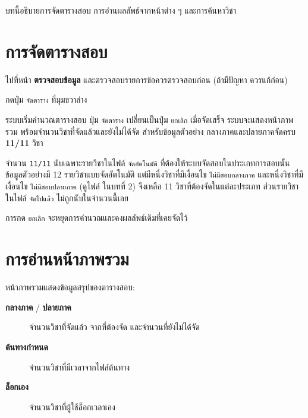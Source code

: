 
\noindent บทนี้อธิบายการจัดตารางสอบ การอ่านผลลัพธ์จากหน้าต่าง ๆ และการค้นหาวิชา

\section{การจัดตารางสอบ}

\begin{steps}
  \item ไปที่หน้า \textbf{ตรวจสอบข้อมูล} และตรวจสอบรายการข้อควรตรวจสอบก่อน
        (ถ้ามีปัญหา ควรแก้ก่อน)
  \item กดปุ่ม \texttt{จัดตาราง} ที่มุมขวาล่าง
\end{steps}

\begin{expected}
ระบบเริ่มคำนวณตารางสอบ ปุ่ม \texttt{จัดตาราง} เปลี่ยนเป็นปุ่ม \texttt{ยกเลิก}
เมื่อจัดเสร็จ ระบบจะแสดงหน้าภาพรวม พร้อมจำนวนวิชาที่จัดแล้วและยังไม่ได้จัด
สำหรับข้อมูลตัวอย่าง กลางภาคและปลายภาคจัดครบ \textbf{11/11} วิชา
\end{expected}

จำนวน \texttt{11/11} นับเฉพาะรายวิชาในไฟล์ \texttt{จัดอัตโนมัติ}
ที่ต้องให้ระบบจัดสอบในประเภทการสอบนั้น ข้อมูลตัวอย่างมี 12 รายวิชาแบบจัดอัตโนมัติ
แต่มีหนึ่งวิชาที่มีเงื่อนไข \texttt{ไม่มีสอบกลางภาค} และหนึ่งวิชาที่มีเงื่อนไข
\texttt{ไม่มีสอบปลายภาค} (ดูไฟล์  ในบทที่ 2)
จึงเหลือ 11 วิชาที่ต้องจัดในแต่ละประเภท ส่วนรายวิชาในไฟล์ \texttt{จัดไปแล้ว}
ไม่ถูกนับในจำนวนนี้เลย

\begin{caution}
การกด \texttt{ยกเลิก} จะหยุดการคำนวณและคงผลลัพธ์เดิมที่เคยจัดไว้
\end{caution}


\section{การอ่านหน้าภาพรวม}

หน้าภาพรวมแสดงข้อมูลสรุปของตารางสอบ:

\begin{description}
  \item[\textbf{กลางภาค} / \textbf{ปลายภาค}] จำนวนวิชาที่จัดแล้ว จากที่ต้องจัด
        และจำนวนที่ยังไม่ได้จัด
  \item[\textbf{ต้นทางกำหนด}] จำนวนวิชาที่มีเวลาจากไฟล์ต้นทาง
  \item[\textbf{ล็อกเอง}] จำนวนวิชาที่ผู้ใช้ล็อกเวลาเอง
\end{description}

